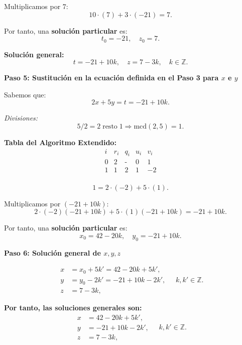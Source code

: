 \documentclass[a4paper,12pt]{article}
\begin{document}
\begin{ejemplo}[title={Ecuación diofántica con 3 incógnitas (Segundo caso)}]

Multiplicamos por \(7\):
\[
10 \cdot (7) + 3 \cdot (-21) = 7.
\]

Por tanto, una \textbf{solución particular} es:
\[
t_0 = -21, \quad z_0 = 7.
\]

\textbf{Solución general:}
\[
t = -21 + 10k, \quad z = 7 - 3k, \quad k \in \mathbb{Z}.
\]

\bigskip

\textbf{Paso 5: Sustitución en la ecuación definida en el Paso 3 para \(x\) e \(y\)}

Sabemos que:
\[
2x + 5y = t = -21 + 10k.
\]

\textit{Divisiones:}
\[
5 / 2 = 2 \;\text{resto}\; \boxed{1}
\Rightarrow \text{mcd}(2,5) = \boxed{1}.
\]

\textbf{Tabla del Algoritmo Extendido:}
\[
\begin{array}{c|c|c|c|c}
i & r_i & q_i & u_i & v_i \\
\hline
0 & 2 & \text{-} & 0 & 1 \\
1 & \boxed{1} & 2 & 1 & -2 \\
\end{array}
\]

\[
\boxed{1} = 2 \cdot (-2) + 5 \cdot (1).
\]

Multiplicamos por \((-21 + 10k)\):
\[
2 \cdot (-2)(-21 + 10k) + 5 \cdot (1)(-21 + 10k) = -21 + 10k.
\]

Por tanto, una \textbf{solución particular} es:
\[
x_0 = 42 - 20k, \quad y_0 = -21 + 10k.
\]

\bigskip

\textbf{Paso 6: Solución general de \(x, y, z\)}

\[
\begin{aligned}
x &= x_0 + 5k' = 42 - 20k + 5k',\\
y &= y_0 - 2k' = -21 + 10k - 2k',\\
z &= 7 - 3k,
\end{aligned}
\quad k, k' \in \mathbb{Z}.
\]

\bigskip

\textbf{Por tanto, las soluciones generales son:}
\[
\boxed{
\begin{aligned}
x &= 42 - 20k + 5k',\\
y &= -21 + 10k - 2k',\\
z &= 7 - 3k,
\end{aligned}
\quad k, k' \in \mathbb{Z}.
}
\]
\end{ejemplo}
\end{document}
